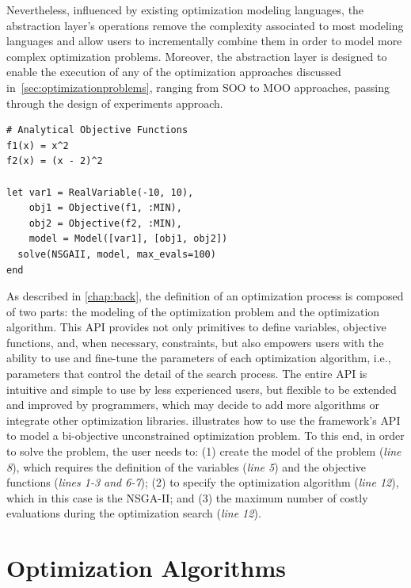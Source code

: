 Nevertheless, influenced by existing optimization modeling languages, the abstraction layer's operations remove the complexity associated to most modeling languages and allow users to incrementally combine them in order to model more complex optimization problems. Moreover, the abstraction layer is designed to enable the execution of any of the optimization approaches discussed in~\cref{sec:optimizationproblems}, ranging from \ac{SOO} to \ac{MOO} approaches, passing through the design of experiments approach.

\begin{lstlisting}[caption={Simple example of the framework's API.},label=juliaCode]
# Analytical Objective Functions
f1(x) = x^2
f2(x) = (x - 2)^2

let var1 = RealVariable(-10, 10),
	obj1 = Objective(f1, :MIN),
	obj2 = Objective(f2, :MIN),
	model = Model([var1], [obj1, obj2])
  solve(NSGAII, model, max_evals=100) 
end
\end{lstlisting}

As described in \cref{chap:back}, the definition of an optimization process is composed of two parts: the modeling of the optimization problem and the optimization algorithm. This \ac{API} provides not only primitives to define variables, objective functions, and, when necessary, constraints, but also empowers users with the ability to use and fine-tune the parameters of each optimization algorithm, i.e., parameters that control the detail of the search process. The entire \ac{API} is intuitive and simple to use by less experienced users, but flexible to be extended and improved by programmers, which may decide to add more algorithms or integrate other optimization libraries.  illustrates how to use the framework's \ac{API} to model a bi-objective unconstrained optimization problem. To this end, in order to solve the problem, the user needs to: (1) create the model of the problem (\textit{line 8}), which requires the definition of the variables (\textit{line 5}) and the objective functions (\textit{lines 1-3 and 6-7}); (2) to specify the optimization algorithm (\textit{line 12}), which in this case is the \ac{NSGA-II}; and (3) the maximum number of costly evaluations during the optimization search (\textit{line 12}).


\section{Optimization Algorithms}
\label{sec:optalgos}

